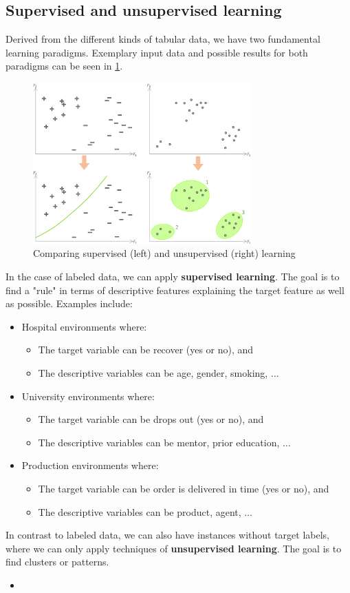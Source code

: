 \subsection{Supervised and unsupervised learning}
Derived from the different kinds of tabular data, we have two fundamental learning paradigms. Exemplary input data and possible results for both paradigms can be seen in \ref{fig:1_sv_vs_usv}.

\begin{figure}[H]
  \centering
  \includegraphics[width=0.75\textwidth]{assets/basics/SV_vs_US.png}
  \caption{Comparing supervised (left) and unsupervised (right) learning}
  \label{fig:1_sv_vs_usv}
\end{figure}

In the case of labeled data, we can apply \textbf{supervised learning}. The goal is to find a "rule" in terms of descriptive features explaining the target feature as well as possible. Examples include:
\begin{itemize}
  \item Hospital environments where:
  \begin{itemize}
    \item The target variable can be {\color{ForestGreen}recover (yes or no)}, and 
    \item The descriptive variables can be {\color{ForestGreen}age, gender, smoking, $\dots$}
  \end{itemize}
  \item University environments where:
  \begin{itemize}
    \item The target variable can be {\color{ForestGreen}drops out (yes or no)}, and 
    \item The descriptive variables can be {\color{ForestGreen}mentor, prior education, $\dots$}
  \end{itemize}
  \item Production environments where:
  \begin{itemize}
    \item The target variable can be {\color{ForestGreen}order is delivered in time (yes or no)}, and 
    \item The descriptive variables can be {\color{ForestGreen}product, agent, $\dots$}
  \end{itemize}
\end{itemize}

In contrast to labeled data, we can also have instances without target labels, where we can only apply techniques of \textbf{unsupervised learning}. The goal is to find clusters or patterns.
\begin{itemize}
  \item 
\end{itemize}
  
